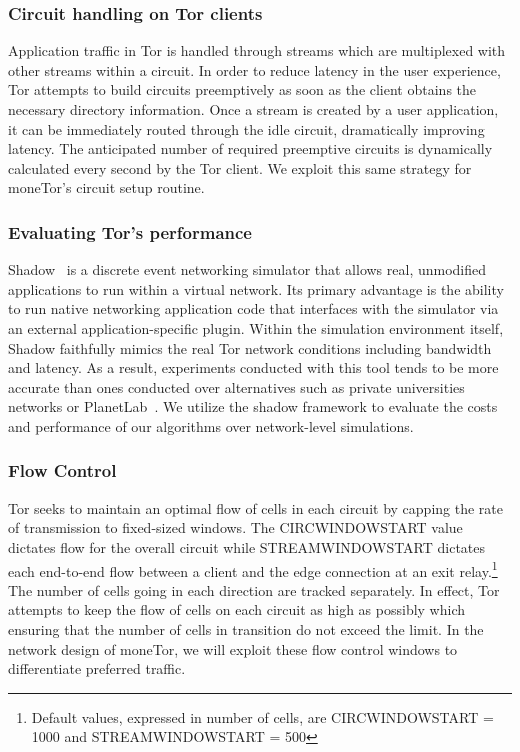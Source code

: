 \subsubsection{Circuit handling on Tor clients}
%

Application traffic in Tor is handled through streams
which are multiplexed with other streams within a circuit. In order to reduce
latency in the user experience, Tor attempts to build circuits preemptively as
soon as the client obtains the necessary directory information. Once a stream is
created by a user application, it can be immediately routed through the idle
circuit, dramatically improving latency. The anticipated number of required
preemptive circuits is dynamically calculated every second by the Tor client. We
exploit this same strategy for moneTor's circuit setup routine.

\subsubsection{Evaluating Tor's performance}
Shadow~\cite{jansen2011shadow} is a discrete event networking simulator that
allows real, unmodified applications to run within a virtual network. Its
primary advantage is the ability to run native networking application code that
interfaces with the simulator via an external application-specific
plugin. Within the simulation environment itself, Shadow faithfully mimics the
real Tor network conditions including bandwidth and latency. As a result,
experiments conducted with this tool tends to be more accurate than ones
conducted over alternatives such as private universities networks or
PlanetLab~\cite{chun2003planetlab}. We utilize the shadow framework to
evaluate the costs and performance of our algorithms over network-level
simulations.


\subsubsection{Flow Control} Tor seeks to maintain an optimal flow of cells in each
circuit by capping the rate of transmission to fixed-sized windows. The
CIRCWINDOWSTART value dictates flow for the overall circuit while
STREAMWINDOWSTART dictates each end-to-end flow between a client and the edge
connection at an exit relay.\footnote{Default values, expressed in number of
  cells, are CIRCWINDOWSTART = 1000 and STREAMWINDOWSTART = 500} The number
of cells going in each direction are tracked separately. In effect, Tor attempts
to keep the flow of cells on each circuit as high as possibly which ensuring
that the number of cells in transition do not exceed the limit. In the network
design of moneTor, we will exploit these flow control windows to differentiate
preferred traffic.

